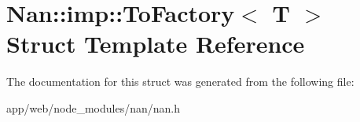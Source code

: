 \hypertarget{struct_nan_1_1imp_1_1_to_factory}{}\section{Nan\+:\+:imp\+:\+:To\+Factory$<$ T $>$ Struct Template Reference}
\label{struct_nan_1_1imp_1_1_to_factory}


The documentation for this struct was generated from the following file\+:\begin{DoxyCompactItemize}
\item 
app/web/node\+\_\+modules/nan/nan.\+h\end{DoxyCompactItemize}
